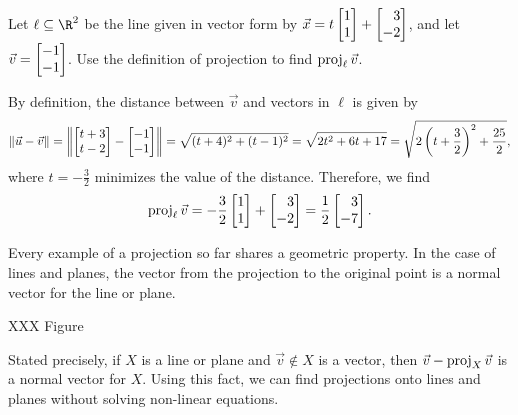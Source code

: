 \begin{example}
	Let $\ell\subseteq \R^2$ be the line given in vector form by $\vec x=t\mat{1\\1}+\mat{3\\-2}$,
	and let $\vec v=\mat{-1\\-1}$. Use the definition of projection to find $\operatorname{proj}_\ell \vec v$.

	By definition, the distance between $\vec v$ and vectors in $\ell$ is given by
	\[
	    \Norm{\vec u-\vec v}=\norm*{\mat{t+3\\t-2}-\mat{-1\\-1}} = \sqrt{(t+4)^2+(t-1)^2}=\sqrt{2t^2+6t+17}=\sqrt{2\left(t+\frac{3}{2}\right)^2+\frac{25}{2}},
	\]
	where $t=-\frac{3}{2}$ minimizes the value of the distance. Therefore, we find 
	\[
	    \Proj_\ell \vec v=-\frac{3}{2}\mat{1\\1}+\mat{3\\-2}=\frac{1}{2}\mat{3\\-7}.
	\]
\end{example}

Every example of a projection so far shares a geometric property. In the case of lines and planes,
the vector from the projection	to the original point is a normal vector for the line or plane.

XXX Figure

Stated precisely, if $X$ is a line or plane and $\vec v\notin X$ is a vector, then $\vec v-\operatorname{proj}_X\vec v$ is a
normal vector for $X$. Using this fact, we can find projections onto lines and planes without solving
non-linear equations.

